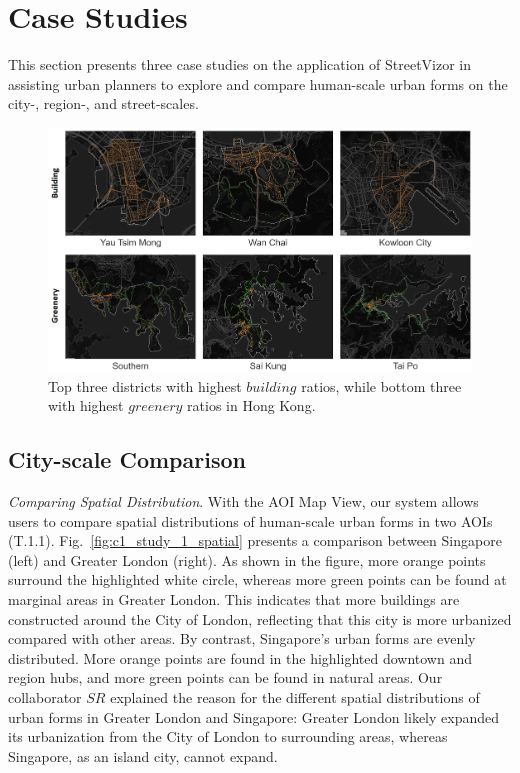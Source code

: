 \section{Case Studies}

This section presents three case studies on the application of StreetVizor in assisting urban planners to explore and compare human-scale urban forms on the city-, region-, and street-scales.


\begin{figure}[t]
	\centering
	\includegraphics[width=0.98\columnwidth]{figure/streetvizor/fig9_study_2/region-functionality.png}
	\vspace{-5mm}
	\caption{Top three districts with highest $building$ ratios, while bottom three with highest $greenery$ ratios in Hong Kong.}
	\label{fig:s1_region-funcitonality}
	\vspace{-4mm}
\end{figure}

\subsection{City-scale Comparison}

\textit{Comparing Spatial Distribution}.
With the AOI Map View, our system allows users to compare spatial distributions of human-scale urban forms in two AOIs (T.1.1).
Fig.~\ref{fig:c1_study_1_spatial} presents a comparison between Singapore (left) and Greater London (right).
As shown in the figure, more orange points surround the highlighted white circle, whereas more green points can be found at marginal areas in Greater London.
This indicates that more buildings are constructed around the City of London, reflecting that this city is more urbanized compared with other areas.
By contrast, Singapore's urban forms are evenly distributed.
More orange points are found in the highlighted downtown and region hubs, and more green points can be found in natural areas.
Our collaborator $SR$ explained the reason for the different spatial distributions of urban forms in Greater London and Singapore: Greater London likely expanded its urbanization from the City of London to surrounding areas, whereas Singapore, as an island city, cannot expand.

